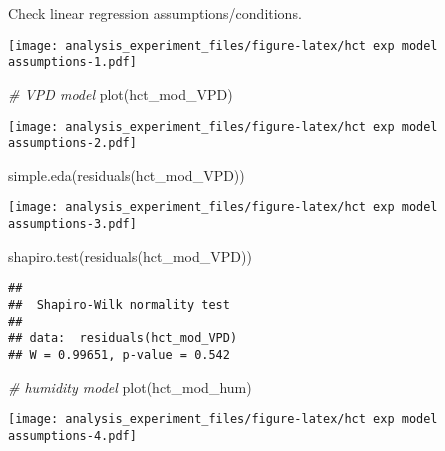 \documentclass[
]{article}
\newenvironment{Shaded}{\begin{snugshade}}{\end{snugshade}}
\newcommand{\CommentTok}[1]{\textcolor[rgb]{0.56,0.35,0.01}{\textit{#1}}}
\newcommand{\FunctionTok}[1]{\textcolor[rgb]{0.00,0.00,0.00}{#1}}
\newcommand{\NormalTok}[1]{#1}
\newcommand{\SpecialCharTok}[1]{\textcolor[rgb]{0.00,0.00,0.00}{#1}}
\begin{document}
Check linear regression assumptions/conditions.

\begin{Shaded}
\end{Shaded}

\texttt{[image: analysis\_experiment\_files/figure-latex/hct exp model assumptions-1.pdf]}

\begin{Shaded}
\begin{Highlighting}[]
\CommentTok{\# VPD model}
\FunctionTok{plot}\NormalTok{(hct\_mod\_VPD)}
\end{Highlighting}
\end{Shaded}

\texttt{[image: analysis\_experiment\_files/figure-latex/hct exp model assumptions-2.pdf]}

\begin{Shaded}
\begin{Highlighting}[]
\FunctionTok{simple.eda}\NormalTok{(}\FunctionTok{residuals}\NormalTok{(hct\_mod\_VPD))}
\end{Highlighting}
\end{Shaded}

\texttt{[image: analysis\_experiment\_files/figure-latex/hct exp model assumptions-3.pdf]}

\begin{Shaded}
\begin{Highlighting}[]
\FunctionTok{shapiro.test}\NormalTok{(}\FunctionTok{residuals}\NormalTok{(hct\_mod\_VPD))}
\end{Highlighting}
\end{Shaded}

\begin{verbatim}
## 
##  Shapiro-Wilk normality test
## 
## data:  residuals(hct_mod_VPD)
## W = 0.99651, p-value = 0.542
\end{verbatim}

\begin{Shaded}
\begin{Highlighting}[]
\CommentTok{\# humidity model}
\FunctionTok{plot}\NormalTok{(hct\_mod\_hum)}
\end{Highlighting}
\end{Shaded}

\texttt{[image: analysis\_experiment\_files/figure-latex/hct exp model assumptions-4.pdf]}
\end{document}
